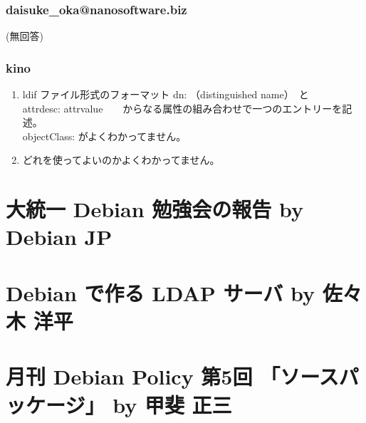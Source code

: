 \documentclass[cjk,dvipdfmx,10pt,%
hyperref={bookmarks=true,bookmarksnumbered=true,bookmarksopen=false,%
colorlinks=false,%
pdftitle={第 61 回 関西 Debian 勉強会},%
pdfauthor={倉敷・のがた・かわだ・佐々木},%
pdfsubject={資料},%
}]{beamer}
\begin{document}
\begin{frame}
  \frametitle{ daisuke\_oka@nanosoftware.biz }
  (無回答)
\end{frame}

\begin{frame}
  \frametitle{ kino }
  \begin{enumerate}
  \item ldif ファイル形式のフォーマット
    dn: （distinguished name）　と\\
    attrdesc: attrvalue　　からなる属性の組み合わせで一つのエントリーを記述。\\
    objectClass: がよくわかってません。
  \item どれを使ってよいのかよくわかってません。
  \end{enumerate}
\end{frame}


\section{大統一 Debian 勉強会の報告 by Debian JP}


\section{Debian で作る LDAP サーバ by 佐々木 洋平}


\section{月刊 Debian Policy 第5回 「ソースパッケージ」 by 甲斐 正三}

\end{document}
